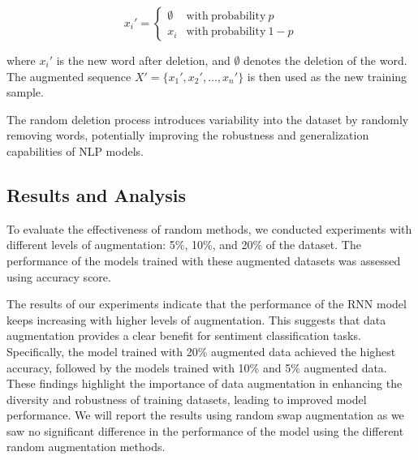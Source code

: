 \documentclass[10pt]{extarticle}
\begin{document}
\[
  x_i' =
  \begin{cases}
    \emptyset & \mathrm{with\ probability\ } p     \\
    x_i       & \mathrm{with\ probability\ } 1 - p
  \end{cases}
\]

where \( x_i' \) is the new word after deletion, and \( \emptyset \) denotes
the deletion of the word. The augmented sequence \( X' = \{x_1', x_2', \ldots,
x_n'\} \) is then used as the new training sample.

The random deletion process introduces variability into the dataset by randomly
removing words, potentially improving the robustness and generalization
capabilities of NLP models.

\subsection{Results and Analysis}

To evaluate the effectiveness of random methods, we conducted experiments with
different levels of augmentation: 5\%, 10\%, and 20\% of the dataset. The
performance of the models trained with these augmented datasets was assessed
using accuracy score.

The results of our experiments indicate that the performance of the RNN model
keeps increasing with higher levels of augmentation. This suggests that data
augmentation provides a clear benefit for sentiment classification tasks.
Specifically, the model trained with 20\% augmented data achieved the highest
accuracy, followed by the models trained with 10\% and 5\% augmented data.
These findings highlight the importance of data augmentation in enhancing the
diversity and robustness of training datasets, leading to improved model
performance. We will report the results using random swap augmentation as we
saw no significant difference in the performance of the model using the
different random augmentation methods.
\end{document}
